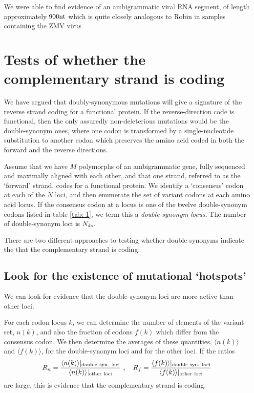 \documentclass[unnumsec,webpdf,contemporary,large,namedate]{oup-authoring-template}%
\theoremstyle{thmstyleone}%
\theoremstyle{thmstyletwo}%
\theoremstyle{thmstylethree}%
\begin{document}
We were able to find evidence of an ambigrammatic viral RNA segment, of length 
approximately $900{\rm nt}$ which is quite closely analogous to Robin in samples 
containing the ZMV virus 

\section{Tests of whether the complementary strand is coding}
\label{sec: 4}

We have argued that doubly-synonymous mutations will give a signature of the 
reverse strand coding for a functional protein. If the reverse-direction code is functional, 
then the only assuredly non-deleterious mutations would be the double-synonym ones,
where one codon is transformed by a single-nucleotide substitution to another 
codon which preserves the amino acid coded in both the forward and 
the reverse directions. 

Assume that we have $M$ polymorphs of an ambigrammatic gene, fully sequenced and 
maximally aligned with each other, and that one strand, referred to as the 
\lq forward' strand, codes for a functional protein. 
We identify a \lq consensus' codon at each of the $N$ loci, 
and then enumerate the set of variant codons at each amino acid locus. 
If the consensus codon at a locus is one of the twelve 
double-synonym codons listed in table \ref{tab: 1}, we term this a \emph{double-synonym locus}.
The number of double-synonym loci is $N_{\rm ds}$.

There are two different approaches to testing whether 
double synonyms indicate the that the complementary strand is coding:

\subsection{Look for the existence of mutational \lq hotspots'}
\label{sec: 4.1} 

We can look for evidence that the double-synonym loci are more active than other loci. 

For each codon locus $k$, we can determine the number of elements of the variant set, $n(k)$, 
and also the fraction of codons $f(k)$ which differ from the consensus codon. 
We then determine the averages of these quantities, $\langle n(k)\rangle$ and $\langle f(k)\rangle$, 
for the double-synonym loci and for the other loci. If the ratios
%
\begin{equation}
\label{eq: 4.1}
R_n=\frac{\langle n(k)\rangle\vert_{\rm double\ syn.\ loci}}{\langle n(k)\rangle\vert_{\rm other\ loci}}
\ ,\ \ \ 
R_f=\frac{\langle f(k)\rangle\vert_{\rm double\ syn.\ loci}}{\langle f(k)\rangle\vert_{\rm other\ loci}}
\end{equation}
%
are large, this is evidence that the complementary strand is coding. 
\end{document}
